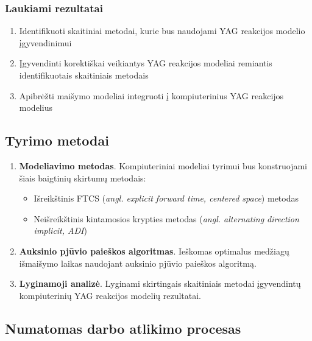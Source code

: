 \documentclass[]{VUMIFTemplateClass}
\begin{document}
\subsubsection{Laukiami rezultatai}
\begin{enumerate}
    \item Identifikuoti skaitiniai metodai, kurie bus naudojami YAG reakcijos modelio įgyvendinimui

    \item Įgyvendinti korektiškai veikiantys YAG reakcijos modeliai remiantis identifikuotais skaitiniais metodais

    \item Apibrėžti maišymo modeliai integruoti į kompiuterinius YAG reakcijos modelius

\end{enumerate}

\subsection{Tyrimo metodai}

\begin{enumerate}
    \item \textbf{Modeliavimo metodas}. Kompiuteriniai modeliai tyrimui bus konstruojami šiais baigtinių skirtumų metodais:
    \begin{itemize}
        \item Išreikštinis FTCS (\textit{angl. explicit forward time, centered space}) metodas
        \item Neišreikštinis kintamosios krypties metodas (\textit{angl. alternating direction implicit, ADI}) 
    \end{itemize}
    \item \textbf{Auksinio pjūvio paieškos algoritmas}. Ieškomas optimalus medžiagų išmaišymo laikas naudojant auksinio pjūvio paieškos algoritmą.
    \item \textbf{Lyginamoji analizė}. Lyginami skirtingais skaitiniais metodai įgyvendintų kompiuterinių YAG reakcijos modelių rezultatai. 
\end{enumerate}


\subsection{Numatomas darbo atlikimo procesas}
\end{document}
